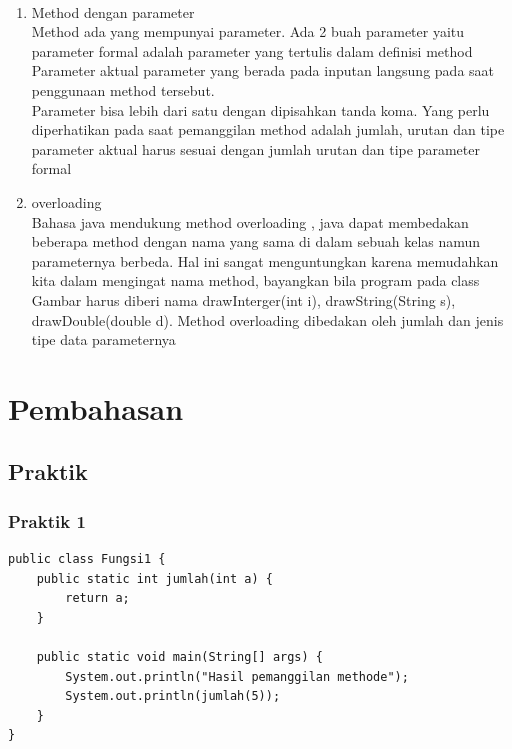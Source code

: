 \documentclass[a4paper,12pt]{article}
\begin{document}
\paragraph{}
\begin{enumerate}
    \item Method dengan parameter\\
        Method ada yang mempunyai parameter. Ada 2 buah parameter yaitu
        parameter formal adalah parameter yang tertulis dalam definisi method
        Parameter aktual parameter yang berada pada inputan langsung pada saat
        penggunaan method tersebut.\\

        Parameter bisa lebih dari satu dengan dipisahkan tanda koma. Yang perlu
        diperhatikan pada saat pemanggilan method adalah jumlah, urutan dan tipe
        parameter aktual harus sesuai dengan jumlah urutan dan tipe parameter formal

    \item overloading\\
        Bahasa java mendukung method overloading , java dapat membedakan
        beberapa method dengan nama yang sama di dalam sebuah kelas namun
        parameternya berbeda. Hal ini sangat menguntungkan karena memudahkan kita
        dalam mengingat nama method, bayangkan bila program pada class Gambar
        harus diberi nama drawInterger(int i), drawString(String s), drawDouble(double
        d). Method overloading dibedakan oleh jumlah dan jenis tipe data parameternya
\end{enumerate}

\newpage

\section{Pembahasan}
\subsection{Praktik}
\subsubsection{Praktik 1}
\begin{lstlisting}
public class Fungsi1 {
    public static int jumlah(int a) {
        return a;
    }

    public static void main(String[] args) {
        System.out.println("Hasil pemanggilan methode");
        System.out.println(jumlah(5));
    }
}
\end{lstlisting}
\end{document}
